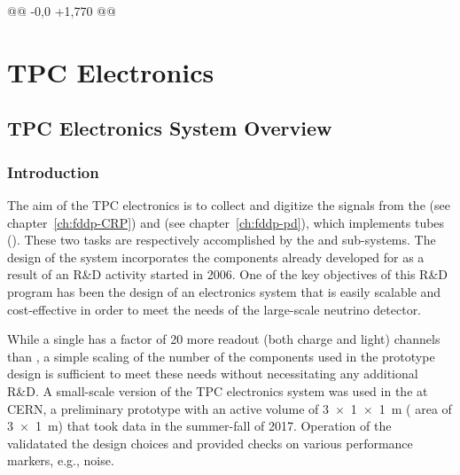 @@ -0,0 +1,770 @@
\chapter{TPC Electronics}
\label{ch:fddp-tpc-elec}


\section{TPC Electronics System Overview}
\label{sec:fddp-tpc-elec-ov}

\subsection{Introduction}
\label{sec:fddp-tpc-elec-intro}

The aim of the  TPC electronics is to collect and digitize the signals from the %
 (see chapter~\ref{ch:fddp-CRP}) and  (see chapter~\ref{ch:fddp-pd}), which implements %
 tubes (). %
These two tasks are respectively accomplished by the  and  sub-systems.
The design of the system incorporates the components already developed for  as a result of an R\&D activity started in 2006. One of the key objectives of this R\&D program has been the design of an electronics system that is easily scalable and cost-effective in order to meet the needs of the large-scale neutrino  detector.  %

While a single  has a factor of \num{20} more readout (both charge and light) channels than , a simple scaling of the number of the components used in the prototype design is sufficient to meet these needs without necessitating any additional R\&D. A small-scale version of the TPC electronics system was used in the  at CERN, a preliminary \dual \lartpc prototype with an active volume  of \SI[product-units=power]{3x1x1}{m} ( area of \SI[product-units=power]{3x1}{m}) that took data in the summer-fall of 2017. %
Operation of the  validatated the design choices and provided checks on various performance markers, e.g., noise. 

